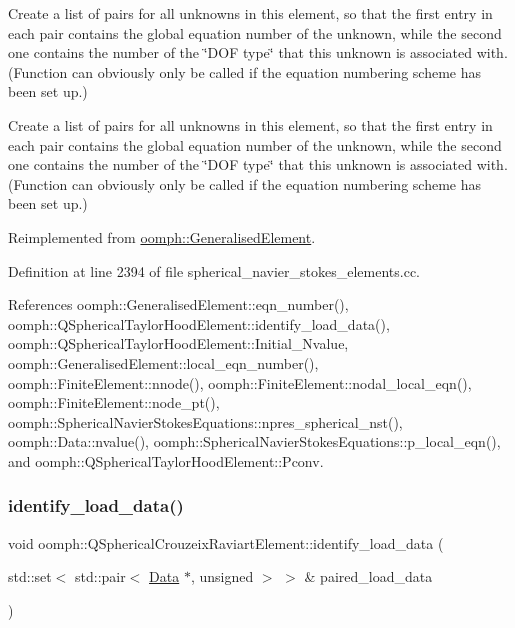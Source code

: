 Create a list of pairs for all unknowns in this element, so that the first entry in each pair contains the global equation number of the unknown, while the second one contains the number of the \char`\"{}\+D\+O\+F type\char`\"{} that this unknown is associated with. (Function can obviously only be called if the equation numbering scheme has been set up.) 

Create a list of pairs for all unknowns in this element, so that the first entry in each pair contains the global equation number of the unknown, while the second one contains the number of the \char`\"{}\+D\+O\+F type\char`\"{} that this unknown is associated with. (Function can obviously only be called if the equation numbering scheme has been set up.) 

Reimplemented from \hyperlink{classoomph_1_1GeneralisedElement_a069f59bfc3e607a5bebba52c6314d777}{oomph\+::\+Generalised\+Element}.



Definition at line 2394 of file spherical\+\_\+navier\+\_\+stokes\+\_\+elements.\+cc.



References oomph\+::\+Generalised\+Element\+::eqn\+\_\+number(), oomph\+::\+Q\+Spherical\+Taylor\+Hood\+Element\+::identify\+\_\+load\+\_\+data(), oomph\+::\+Q\+Spherical\+Taylor\+Hood\+Element\+::\+Initial\+\_\+\+Nvalue, oomph\+::\+Generalised\+Element\+::local\+\_\+eqn\+\_\+number(), oomph\+::\+Finite\+Element\+::nnode(), oomph\+::\+Finite\+Element\+::nodal\+\_\+local\+\_\+eqn(), oomph\+::\+Finite\+Element\+::node\+\_\+pt(), oomph\+::\+Spherical\+Navier\+Stokes\+Equations\+::npres\+\_\+spherical\+\_\+nst(), oomph\+::\+Data\+::nvalue(), oomph\+::\+Spherical\+Navier\+Stokes\+Equations\+::p\+\_\+local\+\_\+eqn(), and oomph\+::\+Q\+Spherical\+Taylor\+Hood\+Element\+::\+Pconv.

\mbox{\label{classoomph_1_1QSphericalCrouzeixRaviartElement_a3ef0fa0d09e3a9e495f348801723d549}} 
\subsubsection{\texorpdfstring{identify\+\_\+load\+\_\+data()}{identify\_load\_data()}}
{\footnotesize\ttfamily void oomph\+::\+Q\+Spherical\+Crouzeix\+Raviart\+Element\+::identify\+\_\+load\+\_\+data (\begin{DoxyParamCaption}\item[{std\+::set$<$ std\+::pair$<$ \hyperlink{classoomph_1_1Data}{Data} $\ast$, unsigned $>$ $>$ \&}]{paired\+\_\+load\+\_\+data }\end{DoxyParamCaption})\hspace{0.3cm}{\ttfamily [virtual]}}



